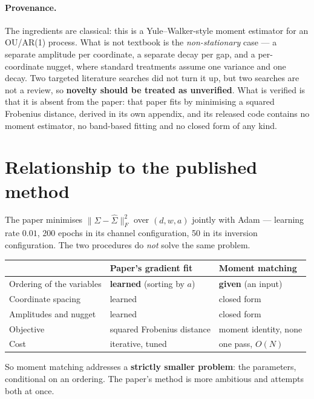 \documentclass[11pt,a4paper]{article}
\begin{document}
\paragraph{Provenance.} The ingredients are classical: this is a Yule--Walker-style moment
estimator for an OU/AR(1) process. What is not textbook is the \emph{non-stationary} case ---
a separate amplitude per coordinate, a separate decay per gap, and a per-coordinate nugget,
where standard treatments assume one variance and one decay. Two targeted literature searches
did not turn it up, but two searches are not a review, so \textbf{novelty should be treated as
unverified}. What is verified is that it is absent from the paper: that paper fits by
minimising a squared Frobenius distance, derived in its own appendix, and its released code
contains no moment estimator, no band-based fitting and no closed form of any kind.

\section{Relationship to the published method}
\label{sec:relation}

The paper minimises $\lVert \Sigma - \hat\Sigma \rVert_F^2$ over $(d, w, a)$ jointly with Adam
--- learning rate $0.01$, 200 epochs in its channel configuration, 50 in its inversion
configuration. The two procedures do \emph{not} solve the same problem.

\begin{center}
\begin{tabular}{@{}lll@{}}
\toprule
 & Paper's gradient fit & Moment matching \\
\midrule
Ordering of the variables & \textbf{learned} (sorting by $a$) & \textbf{given} (an input) \\
Coordinate spacing        & learned                            & closed form \\
Amplitudes and nugget     & learned                            & closed form \\
Objective                 & squared Frobenius distance         & moment identity, none \\
Cost                      & iterative, tuned                   & one pass, $O(N)$ \\
\bottomrule
\end{tabular}
\end{center}

So moment matching addresses a \textbf{strictly smaller problem}: the parameters, conditional
on an ordering. The paper's method is more ambitious and attempts both at once.
\end{document}
